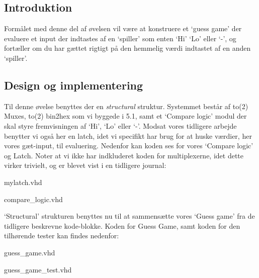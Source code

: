 \documentclass[../journal.tex]{subfiles}
\begin{document}
\subsection{Introduktion}
Formålet med denne del af øvelsen vil være at konstruere et `guess game' der evaluere et input der indtastes af en `spiller' som enten `Hi' `Lo' eller `-', og fortæller om du har gættet rigtigt på den hemmelig værdi indtastet af en anden `spiller'.

\subsection{Design og implementering}
Til denne øvelse benyttes der en \textit{structural} struktur. Systemmet består af to(2) Muxes, to(2) bin2hex som vi byggede i 5.1, samt et `Compare logic' modul der skal styre fremvisningen af `Hi', `Lo' eller `-'. Modsat vores tidligere arbejde benytter vi også her en latch, idet vi specifikt har brug for at huske værdier, her vores gæt-input, til evaluering. Nedenfor kan koden ses for vores `Compare logic' og Latch. Noter at vi ikke har indkluderet koden for multiplexerne, idet dette virker trivielt, og er blevet vist i en tidligere journal:

\begin{table}[H]
    \centering
      \framebox{
        \rule{8pt}{0pt}
          
  }
  \caption{mylatch.vhd}	
  \label{src:mylatch}
\end{table}

\begin{table}[H]
    \centering
      \framebox{
        \rule{8pt}{0pt}
          
  }
  \caption{compare\_logic.vhd}
  \label{src:compare_logic}
\end{table}

`Structural' strukturen benyttes nu til at sammensætte vores `Guess game' fra de tidligere beskrevne kode-blokke. Koden for Guess Game, samt koden for den tilhørende tester kan findes nedenfor:

\begin{table}[H]
    \centering
      \framebox{
        \rule{8pt}{0pt}
          
  }
  \caption{guess\_game.vhd}	
  \label{src:guess_game}
\end{table}

\begin{table}[H]
  \centering
    \framebox{
      \rule{8pt}{0pt}
        
}
\caption{guess\_game\_test.vhd}	
\label{src:guess_game_test}
\end{table}
\end{document}

